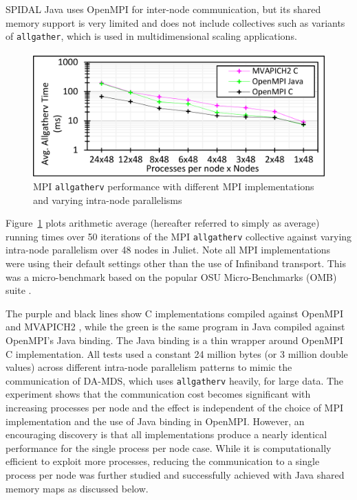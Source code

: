 SPIDAL Java uses OpenMPI for inter-node communication, but its shared memory support is very limited and does not include collectives such as variants of \texttt{allgather}, which is used in multidimensional scaling applications.

\begin{figure}[!h]
\centering
\includegraphics[width=0.9\columnwidth]{figures/fig_default_allgatherv_perf}
\caption{MPI \texttt{allgatherv} performance with different MPI implementations and varying intra-node parallelisms\label{fig:fig_default_allgatherv_perf}}
\end{figure}

Figure~\ref{fig:fig_default_allgatherv_perf} plots arithmetic average (hereafter referred to simply as average) running times over 50 iterations of the MPI \texttt{allgatherv} collective against varying intra-node parallelism over 48 nodes in Juliet. Note all MPI implementations were using their default settings other than the use of Infiniband transport. This was a micro-benchmark based on the popular OSU Micro-Benchmarks (OMB) suite \cite{osubenchmarks}. 

The purple and black lines show C implementations compiled against OpenMPI and MVAPICH2 \cite{1630794}, while the green is the same program in Java compiled against OpenMPI's Java binding. The Java binding is a thin wrapper around OpenMPI C implementation. All tests used a constant 24 million bytes (or 3 million double values) across different intra-node parallelism patterns to mimic the communication of DA-MDS, which uses \texttt{allgatherv} heavily, for large data. The experiment shows that the communication cost becomes significant with increasing processes per node and the effect is independent of the choice of MPI implementation and the use of Java binding in OpenMPI. However, an encouraging discovery is that all implementations produce a nearly identical performance for the single process per node case. While it is computationally efficient to exploit more processes, reducing the communication to a single process per node was further studied and successfully achieved with Java shared memory maps as discussed below.

